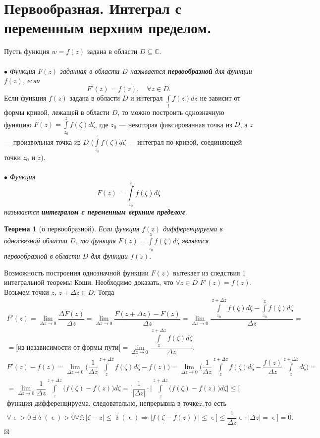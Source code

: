 \documentclass[a4paper, 12pt]{article}
\newenvironment{Proof} %
{\par\noindent{$\blacklozenge$}} %
{\hfill$\scriptstyle\boxtimes$}
\newcommand{\Cm}{\mathbb{C}}
\renewcommand{\leq}{\leqslant}
\renewcommand{\delta}{\updelta}
\newcommand{\intl}{\int\limits_l}
\renewcommand{\epsilon}{\upvarepsilon}
\newcommand{\limdef}{\forall \epsilon >0\ \exists \delta (\epsilon) > 0}
\newtheorem*{theorem}{Теорема}
\begin{document}
\section{Первообразная. Интеграл с переменным верхним пределом.}
Пусть функция $w = f(z)$ задана в области $D \subseteq \Cm$.\\\\
$\bullet$ \textit{Функция $F(z)$ заданная в области $D$ называется \textbf{первообразной} для функции $f(z)$, если $$F'(z) = f(z),\quad \forall z \in D.$$}
Если функция $f(z)$ задана в области $D$ и интеграл $\intl f(z)dz$ не зависит от формы кривой, лежащей в области $D$, то можно построить однозначную функцию $F(z) = \int\limits_{z_0}^z f(\zeta)d\zeta$, где $z_0$ --- некоторая фиксированная точка из $D$, а $z$ --- произвольная точка из $D$ ($\int\limits_{z_0}^z f(\zeta)d\zeta$ --- интеграл по кривой, соединяющей точки $z_0$ и $z$).\\\\
$\bullet$ \textit{Функция $$F(z) = \int\limits_{z_0}^z f(\zeta)d\zeta$$ называется \textbf{интегралом с переменным верхним пределом}.}\begin{theorem}
	[о первообразной] Если функция $f(z)$ дифференцируема в односвязной области $D$, то функция $F(z) = \int\limits_{z_0}^z f(\zeta)d\zeta$ является первообразной в области $D$ для функции $f(z)$.
\end{theorem}\begin{Proof}
Возможность построения однозначной функции $F(z)$ вытекает из  следствия 1 интегральной теоремы Коши. Необходимо доказать, что $\forall z \in D$ $F'(z) = f(z)$. Возьмем точки $z$, $z + \Delta z \in D$. Тогда \begin{multline*}
	F'(z) = \lim\limits_{\Delta z \to 0} \dfrac{\Delta F(z)}{\Delta z} = \lim\limits_{\Delta z \to 0} \dfrac{F(z + \Delta z) - F(z)}{\Delta z} = \lim\limits_{\Delta z \to 0} \dfrac{\int\limits_{z_0}^{z + \Delta z}f(\zeta)d\zeta - \int\limits_{z_0}^{z}f(\zeta)d\zeta}{\Delta z}=\\=\text{[из независимости от формы пути]} = \lim\limits_{\Delta z \to 0} \dfrac{\int\limits_{z}^{z + \Delta z}f(\zeta)d\zeta}{\Delta z}.
\end{multline*}
\begin{multline*}
	F'(z) - f(z) = \lim\limits_{\Delta z \to 0}\Big(\dfrac{1}{\Delta z}\int\limits_{z}^{z + \Delta z}f(\zeta)d\zeta - f(z) \Big) = \lim\limits_{\Delta z \to 0}\Big(\dfrac{1}{\Delta z}\int\limits_{z}^{z + \Delta z}f(\zeta)d\zeta - \dfrac{f(z)}{\Delta z} \int\limits_{z}^{z + \Delta z}d\zeta \Big) = \\ =\lim\limits_{\Delta z \to 0} \dfrac{1}{\Delta z} \int\limits_{z}^{z + \Delta z} \Big( f(\zeta) - f(z)\Big)d\zeta = \Big[ \dfrac{1}{|\Delta z|}\cdot \Big|\int\limits_{z}^{z + \Delta z} \Big( f(\zeta) - f(z)\Big)d\zeta\Big|\leq \big[\\ \text{функция дифференцируема, следовательно, непрерывна в точке} z, \text{то есть} \\ \limdef \forall\zeta : |\zeta - z |\leq\delta (\epsilon) \Rightarrow |f(\zeta - f(z))|\leq \epsilon \big] \leq \dfrac{1}{\Delta z}\epsilon\cdot |\Delta z| = \epsilon\Big] = 0.
\end{multline*}
\end{Proof}\\
\end{document}
